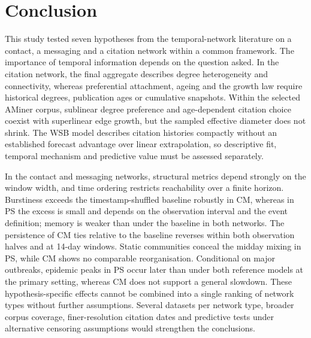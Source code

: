 \section{Conclusion}
\label{sec:conclusion}
This study tested seven hypotheses from the temporal-network literature on a contact, a
messaging and a citation network within a common framework. The importance of temporal
information depends on the question asked. In the citation network, the final aggregate
describes degree heterogeneity and connectivity, whereas preferential attachment, ageing
and the growth law require historical degrees, publication ages or cumulative snapshots.
Within the selected AMiner corpus, sublinear degree preference and age-dependent citation
choice coexist with superlinear edge growth, but the sampled effective diameter does not
shrink. The WSB model describes citation histories compactly without an established
forecast advantage over linear extrapolation, so descriptive fit, temporal mechanism and
predictive value must be assessed separately.

In the contact and messaging networks, structural metrics depend strongly on the window
width, and time ordering restricts reachability over a finite horizon. Burstiness exceeds
the timestamp-shuffled baseline robustly in CM, whereas in PS the excess is small and depends
on the observation interval and the event definition; memory is weaker than under the
baseline in both networks. The persistence of CM ties relative to the baseline reverses
within both observation halves and at 14-day windows. Static communities conceal the midday
mixing in PS, while CM shows no comparable reorganisation. Conditional on major outbreaks,
epidemic peaks in PS occur later than under both reference models at the primary setting,
whereas CM does not support a general slowdown. These hypothesis-specific effects cannot be
combined into a single ranking of network types without further assumptions. Several
datasets per network type, broader corpus coverage, finer-resolution citation dates and
predictive tests under alternative censoring assumptions would strengthen the conclusions.
